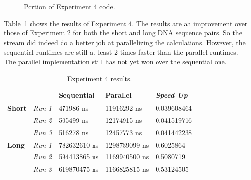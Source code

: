 \documentclass[conference]{IEEEtran}
\begin{document}
\begin{figure}[htbp]
\centerline{}
\caption{Portion of Experiment 4 code.}
\label{15}
\end{figure}

Table~\ref{tab:table4} shows the results of Experiment 4. The results are an improvement over those of Experiment 2 for both the short and long DNA sequence pairs. So the stream did indeed do a better job at parallelizing the calculations. However, the sequential runtimes are still at least 2 times faster than the parallel runtimes. The parallel implementation still has not yet won over the sequential one.

\begin{table}[]
\caption{Experiment 4 results.}
\label{tab:table4}
\begin{tabular}{|l|l|l|l|l|}
\hline
               & \textbf{}      & \textbf{Sequential} & \textbf{Parallel} & \textit{\textbf{Speed Up}} \\ \hline
\textbf{Short} & \textit{Run 1} & 471986 ns           & 11916292 ns       & 0.039608464                \\ \hline
               & \textit{Run 2} & 505499 ns           & 12174915 ns       & 0.041519716                \\ \hline
               & \textit{Run 3} & 516278 ns           & 12457773 ns       & 0.041442238                \\ \hline
\textbf{Long}  & \textit{Run 1} & 782632610 ns        & 1298789099 ns     & 0.6025864                  \\ \hline
               & \textit{Run 2} & 594413865 ns        & 1169940500 ns     & 0.5080719                  \\ \hline
               & \textit{Run 3} & 619870475 ns        & 1166825815 ns     & 0.53124505                 \\ \hline
\end{tabular}
\end{table}
\end{document}
